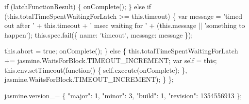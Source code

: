 \begin{DoxyCodeInclude}
  \textcolor{keywordflow}{if} (latchFunctionResult) \{
    onComplete();
  \} \textcolor{keywordflow}{else} \textcolor{keywordflow}{if} (this.totalTimeSpentWaitingForLatch >= this.timeout) \{
    var message = \textcolor{stringliteral}{'timed out after '} + this.timeout + \textcolor{stringliteral}{' msec waiting for '} + (this.message || \textcolor{stringliteral}{'something to
       happen'});
    this.spec.fail(\{
      name: \textcolor{stringliteral}{'timeout'},
      message: message
    \});

    this.abort = \textcolor{keyword}{true};
    onComplete();
  \} \textcolor{keywordflow}{else} \{
    this.totalTimeSpentWaitingForLatch += jasmine.WaitsForBlock.TIMEOUT\_INCREMENT;
    var \textcolor{keyword}{self} = \textcolor{keyword}{this};
    this.env.setTimeout(\textcolor{keyword}{function}() \{
      \textcolor{keyword}{self}.execute(onComplete);
    \}, jasmine.WaitsForBlock.TIMEOUT\_INCREMENT);
  \}
\};

jasmine.version\_= \{
  \textcolor{stringliteral}{"major"}: 1,
  \textcolor{stringliteral}{"minor"}: 3,
  \textcolor{stringliteral}{"build"}: 1,
  \textcolor{stringliteral}{"revision"}: 1354556913
\};

\end{DoxyCodeInclude}
 
